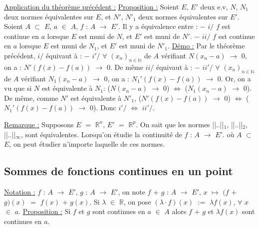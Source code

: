 \documentclass{article}
\begin{document}
\parindent=0cm
\smallbreak
\underline{Application du théorème précédent :}
\smallbreak
\underline{Proposition :} \parindent=1cm \smallbreak
Soient $E$, $E'$ deux e.v, $N$, $N_1$ deux normes équivalentes sur $E$, et $N'$, $N'_1$ deux normes équivalentes sur $E'$.
\smallbreak
Soient $A$ $\subset$ $E$, $a$ $\in$ $A$, $f$ : $A$ $\longrightarrow$ $E'$. Il y a équivalence entre :
\smallbreak $-$ $i/$ $f$ est continue en $a$ lorsque $E$ est muni de $N$, et $E'$ est muni de $N'$.
\smallbreak $-$ $ii/$ $f$ est continue en $a$ lorsque $E$ est muni de $N_1$, et $E'$ est muni de $N'_1$.
\parindent=0cm
\smallbreak
\underline{Démo :} \parindent=1cm \smallbreak
Par le théorème précédent, $i/$ équivaut à :
\smallbreak $-$ $i'/$ $\forall$ $(x_n)_{n \in \mathbb{N}}$ de $A$ vérifiant $N(x_n - a)$ $\longrightarrow $ $0$, on a : $N'(f(x) - f(a))$ $\longrightarrow $ $0$. \smallbreak De même $ii/$ équivaut à :
\smallbreak $-$ $ii'/$ $\forall$ $(x_n)_{n \in \mathbb{N}}$ de $A$ vérifiant $N_1(x_n - a)$ $\longrightarrow $ $0$, on a : $N_1'(f(x) - f(a))$ $\longrightarrow $ $0$.
\smallbreak Or, on a vu que si $N$ est équivalente à $N_1$: ($N(x_n - a)$ $\longrightarrow $ $0$) $\Longleftrightarrow$ ($N_1(x_n - a)$ $\longrightarrow $ $0$). De même, comme \smallbreak $N'$ est équivalente à $N'_1$, ($N'(f(x) - f(a))$ $\longrightarrow $ $0$) $\Longleftrightarrow$ ($N_1'(f(x) - f(a))$ $\longrightarrow $ $0$). Donc $i'/$ $\Longleftrightarrow$ $ii'/$.

\parindent=0cm
\smallbreak
\underline{Remarque :} \parindent=1cm \smallbreak
Supposons $E$ $=$ $\mathbb{R}^n$, $E'$ $=$ $\mathbb{R}^p$. On sait que les normes ||..||$_1$, ||..||$_2$, ||..||$_{\infty}$, sont équivalentes. Lorsqu'on \smallbreak étudie la continuité de $f$ : $A$ $\longrightarrow$ $E'$. où $A$ $\subset$ $E$, on peut étudier n'importe laquelle de ces normes.

\parindent=0cm
\subsection{Sommes de fonctions continues en un point}
\underline{Notation :} \parindent=1cm \smallbreak $f$ : $A$ $\longrightarrow$ $E'$, $g$ : $A$ $\longrightarrow$ $E'$, on note $f$ $+$ $g$ : $A$ $\longrightarrow$ $E'$, $x$ $\mapsto$ $(f$ $+$ $g)(x)$ $=$ $f(x)$ $+$ $g(x)$. Si $\lambda$ $\in$ $\mathbb{R}$, on pose \smallbreak $(\lambda \cdot f)(x)$ $:=$ $\lambda f(x)$, $\forall$ $x$ $\in$ $a$.
\parindent=0cm
\smallbreak
\underline{Proposition :} \parindent=1cm \smallbreak
Si $f$ et $g$ sont continues en $a$ $\in$ $A$ alors $f$ $+$ $g$ et $\lambda f(x)$ sont continues en $a$.
\end{document}
